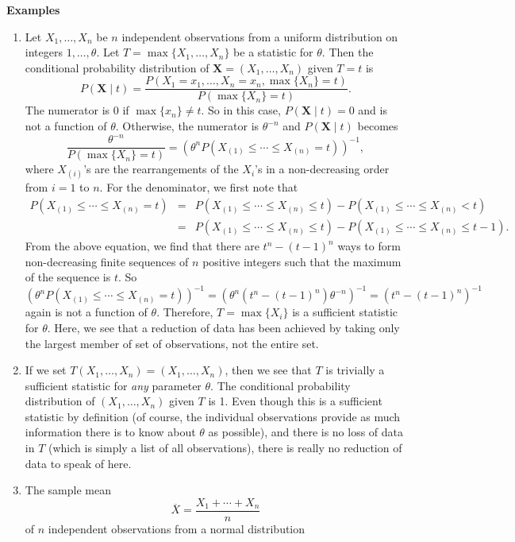 \documentclass[12pt]{article}
\begin{document}
\textbf{Examples}
\begin{enumerate}
\item Let $X_1,\ldots,X_n$ be $n$ independent observations from a
uniform distribution on integers $1,\ldots,\theta$.  Let
$T=\max\lbrace X_1,\ldots,X_n \rbrace$ be a statistic for $\theta$.
 Then the conditional probability distribution of
$\boldsymbol{X}=(X_1,\ldots,X_n)$ given $T=t$ is
$$P(\boldsymbol{X}\mid t)=\frac{P(X_1=x_1,\ldots,X_n=x_n,\max\lbrace X_n
\rbrace=t)}{P(\max\lbrace X_n \rbrace=t)}.$$ The numerator is $0$ if
$\max\lbrace x_n\rbrace\neq t$.  So in this case,
$P(\boldsymbol{X}\mid t)=0$ and is not a function of $\theta$.
Otherwise, the numerator is $\theta^{-n}$ and $P(\boldsymbol{X}\mid
t)$ becomes
$$\frac{\theta^{-n}}{P(\max\lbrace X_n \rbrace=t)}=
(\theta^nP(X_{(1)}\leq \cdots\leq X_{(n)}=t))^{-1},$$ where
$X_{(i)}$'s are the rearrangements of the $X_i$'s in a
non-decreasing order from $i=1$ to $n$.  For the denominator, we first note that
\begin{eqnarray*}
P(X_{(1)}\leq \cdots\leq X_{(n)}=t) &=& P(X_{(1)}\leq \cdots\leq X_{(n)}\leq t)-P(X_{(1)}\leq \cdots\leq X_{(n)}<t) \\ &=& P(X_{(1)}\leq \cdots\leq X_{(n)}\leq t)-P(X_{(1)}\leq \cdots\leq X_{(n)}\leq t-1).
\end{eqnarray*}
From the above equation, we find that there are $t^n-(t-1)^n$ ways to form non-decreasing finite sequences of $n$ positive integers such that the maximum of the sequence is
$t$.  So
$$(\theta^nP(X_{(1)}\leq \cdots\leq X_{(n)}=t))^{-1}=
(\theta^n(t^n-(t-1)^n)\theta^{-n})^{-1}=(t^n-(t-1)^n)^{-1}$$
 again is not a function of $\theta$.  Therefore, $T=\max\lbrace X_i\rbrace$ is a
 sufficient statistic for $\theta$.
 Here, we see that a reduction of data has been achieved by taking
 only the largest member of set of observations, not the entire set.
\item If we set $T(X_1,\ldots,X_n)=(X_1,\ldots,X_n)$, then we see
that $T$ is trivially a sufficient statistic for \emph{any}
parameter $\theta$.  The conditional probability distribution of
$(X_1,\ldots,X_n)$ given $T$ is 1.  Even though this is a sufficient
statistic by definition (of course, the individual observations
provide as much information there is to know about $\theta$ as
possible), and there is no loss of data in $T$ (which is simply a
list of all observations), there is really no reduction of data to
speak of here.
\item The sample mean
$$\overline{X}=\frac{X_1+\cdots+X_n}{n}$$
of $n$ independent observations from a normal distribution

\end{enumerate}
\end{document}
